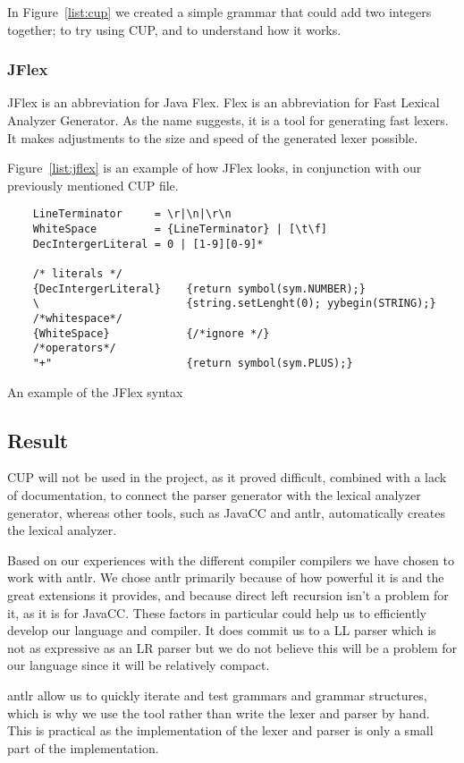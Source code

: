 In Figure~\ref{list:cup} we created a simple grammar that could add two integers together; to try using CUP, and to understand how it works.


\subsubsection{JFlex}
JFlex is an abbreviation for Java Flex. Flex is an abbreviation for Fast Lexical Analyzer Generator. As the name suggests, it is a tool for generating fast lexers. It makes adjustments to the size and speed of the generated lexer possible.

Figure~\ref{list:jflex} is an example of how JFlex looks, in conjunction with our previously mentioned CUP file.


\begin{listing}[htb!]
  \centering
  \begin{verbatim}
    LineTerminator     = \r|\n|\r\n
    WhiteSpace         = {LineTerminator} | [\t\f]
    DecIntergerLiteral = 0 | [1-9][0-9]*

    /* literals */
    {DecIntergerLiteral}    {return symbol(sym.NUMBER);}
    \                       {string.setLenght(0); yybegin(STRING);}
    /*whitespace*/ 
    {WhiteSpace}            {/*ignore */}  
    /*operators*/
    "+"                     {return symbol(sym.PLUS);}
  \end{verbatim}
  \caption{An example of the JFlex syntax}
  \label{list:jflex}
\end{listing}


\subsection{Result}
CUP will not be used in the project, as it proved difficult, combined with a lack of documentation, to connect the parser generator with the lexical analyzer generator, whereas other tools, such as JavaCC and \gls{antlr}, automatically creates the lexical analyzer.

Based on our experiences with the different compiler compilers we have chosen to work with \gls{antlr}. We chose \gls{antlr} primarily because of how powerful it is and the great extensions it provides, and because direct left recursion isn't a problem for it, as it is for JavaCC. These factors in particular could help us to efficiently develop our language and compiler. It does commit us to a LL parser which is not as expressive as an LR parser but we do not believe this will be a problem for our language since it will be relatively compact.

\gls{antlr} allow us to quickly iterate and test grammars and grammar structures, which is why we use the tool rather than write the lexer and parser by hand. This is practical as the implementation of the lexer and parser is only a small part of the implementation.
